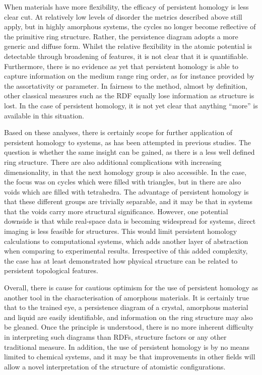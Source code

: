 When materials have more flexibility, the efficacy of persistent homology is less clear cut.
At relatively low levels of disorder the metrics described above still apply, but in highly amorphous systems, the cycles no longer become reflective of the primitive ring structure.
Rather, the persistence diagram adopts a more generic and diffuse form.
Whilst the relative flexibility in the atomic potential is detectable through broadening of features, it is not clear that it is quantifiable.
Furthermore, there is no evidence as yet that persistent homology is able to capture information on the medium range ring order, as for instance provided by the assortativity or \aw{} parameter.
In fairness to the method, almost by definition, other classical measures such as the RDF equally lose information as structure is lost.
In the case of persistent homology, it is not yet clear that anything ``more'' is available in this situation.

Based on these \td{} analyses, there is certainly scope for further application of persistent homology to \thd{} systems, as has been attempted in previous studies.
The question is whether the same insight can be gained, as there is a less well defined ring structure.
There are also additional complications with increasing dimensionality, in that the next homology group is also accessible.
In the \td{} case, the focus was on cycles which were filled with triangles, but in \thd{} there are also voids which are filled with tetrahedra.
The advantage of persistent homology is that these different groups are trivially separable, and it may be that in \thd{} systems that the voids carry more structural significance.
However, one potential downside is that while real\--space data is becoming widespread for \td{} systems, direct imaging is less feasible for \thd{} structures.
This would limit persistent homology calculations to computational systems, which adds another layer of abstraction when comparing to experimental results.
Irrespective of this added complexity, the \td{} case has at least demonstrated how physical structure can be related to persistent topological features.

Overall, there is cause for cautious optimism for the use of persistent homology as another tool in the characterisation of amorphous materials.
It is certainly true that to the trained eye, a persistence diagram of a crystal, amorphous material and liquid are easily identifiable, and information on the ring structure may also be gleaned. 
Once the principle is understood, there is no more inherent difficulty in interpreting such diagrams than RDFs, structure factors or any other traditional measure.
In addition, the use of persistent homology is by no means limited to chemical systems, and it may be that improvements in other fields will allow a novel interpretation of the structure of atomistic configurations.
   
